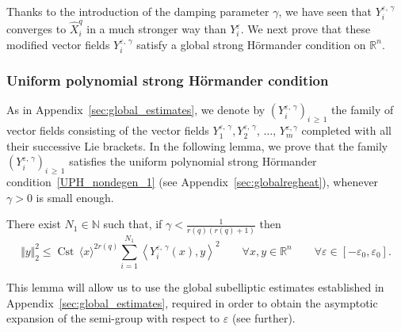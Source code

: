 \documentclass[AHL,Unicode,published]{cedram}
\newcommand*\R{\mathbb{R}}
\newcommand*\N{\mathbb{N}}
\DeclareMathOperator{\Cst}{Cst}
\renewcommand{\geq}{\geqslant}
\renewcommand{\leq}{\leqslant}
\let\oldforall\forall
\renewcommand*{\forall}{\mathrel{\oldforall}}
\begin{document}
Thanks to the introduction of the damping parameter $\gamma$, we have seen that $Y_i^{\varepsilon,\,\gamma}$ converges to $\widehat{X}_i^{q}$ in a much stronger way than $Y_i^\varepsilon$. We next prove that these modified vector fields $Y_i^{\varepsilon,\,\gamma}$ satisfy a global strong H\"ormander condition on $\R^n$.


\subsubsection{Uniform polynomial strong H\"ormander condition}
As in Appendix~\ref{sec:global_estimates}, we denote by $(Y_i^{\varepsilon,\,\gamma})_{i\,\geq\,1}$ the family of vector fields consisting of the vector fields $Y_1^{\varepsilon,\,\gamma}, Y_2^{\varepsilon,\,\gamma},\,\ldots,\,Y_m^{\varepsilon,\gamma}$ completed with all their successive Lie brackets. In the following lemma, we prove that the family $(Y_i^{\varepsilon,\,\gamma})_{i\,\geq\,1}$ satisfies the uniform polynomial strong H\"ormander condition~\eqref{UPH_nondegen_1} (see Appendix~\ref{sec:globalregheat}), whenever $\gamma>0$ is small enough.

\begin{lemm}\label{lem_unif_poly_Hormander}
There exist $N_1\in\N$ such that, if $\gamma<\frac{1}{r(q)(r(q)+1)}$ then
\begin{equation}\label{ccl_lem_unif_poly_Hormander}
\Vert y\Vert_2^2 \leq \Cst\, \langle x\rangle^{2r(q)} \sum_{i=1}^{N_1} \left\langle Y_i^{\varepsilon,\,\gamma}(x),y\right\rangle^2
\qquad \forall x,y\in\R^n\qquad\forall \varepsilon\in[-\varepsilon_0,\varepsilon_0].
\end{equation}
\end{lemm}

This lemma will allow us to use the global subelliptic estimates established in Appendix~\ref{sec:global_estimates}, required in order to obtain the asymptotic expansion of the semi-group with respect to $\varepsilon$ (see further).
\end{document}
